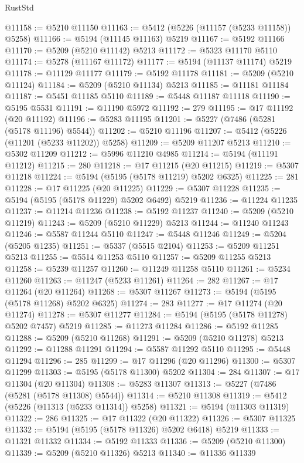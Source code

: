 \begin{lexlean}{RustStd}
\begin{coremodule}
@11158 := @5210 @11150
@11163 := @5412 (@5226 (@11157 (@5233 @11158)) @5258)
@11166 := @5194 (@11145 @11163) @5219
@11167 := @5192 @11166
@11170 := @5209 (@5210 @11142) @5213
@11172 := @5323 @11170 @5110
@11174 := @5278 (@11167 @11172)
@11177 := @5194 (@11137 @11174) @5219
@11178 := @11129 @11177
@11179 := @5192 @11178
@11181 := @5209 (@5210 @11124)
@11184 := @5209 (@5210 @11134) @5213
@11185 := @11181 @11184
@11187 := @5451 @11185 @5110
@11189 := @5448 @11187 @11118
@11190 := @5195 @5531
@11191 := @11190 @5972
@11192 := 279
@11195 := @17 @11192 (@20 @11192)
@11196 := @5283 @11195
@11201 := @5227 (@7486 (@5281 (@5178 @11196) @5544))
@11202 := @5210 @11196
@11207 := @5412 (@5226 (@11201 (@5233 @11202)) @5258)
@11209 := @5209 @11207 @5213
@11210 := @5302 @11209
@11212 := @5996 @11210 @4985
@11214 := @5194 (@11191 @11212)
@11215 := 280
@11218 := @17 @11215 (@20 @11215)
@11219 := @5307 @11218
@11224 := @5194 (@5195 (@5178 @11219) @5202 @6325)
@11225 := 281
@11228 := @17 @11225 (@20 @11225)
@11229 := @5307 @11228
@11235 := @5194 (@5195 (@5178 @11229) @5202 @6492) @5219
@11236 := @11224 @11235
@11237 := @11214 @11236
@11238 := @5192 @11237
@11240 := @5209 (@5210 @11219)
@11243 := @5209 (@5210 @11229) @5213
@11244 := @11240 @11243
@11246 := @5587 @11244 @5110
@11247 := @5448 @11246
@11249 := @5204 (@5205 @1235)
@11251 := @5337 (@5515 @2104)
@11253 := @5209 @11251 @5213
@11255 := @5514 @11253 @5110
@11257 := @5209 @11255 @5213
@11258 := @5239 @11257
@11260 := @11249 @11258 @5110
@11261 := @5234 @11260
@11263 := @11247 (@5233 @11261)
@11264 := 282
@11267 := @17 @11264 (@20 @11264)
@11268 := @5307 @11267
@11273 := @5194 (@5195 (@5178 @11268) @5202 @6325)
@11274 := 283
@11277 := @17 @11274 (@20 @11274)
@11278 := @5307 @11277
@11284 := @5194 (@5195 (@5178 @11278) @5202 @7457) @5219
@11285 := @11273 @11284
@11286 := @5192 @11285
@11288 := @5209 (@5210 @11268)
@11291 := @5209 (@5210 @11278) @5213
@11292 := @11288 @11291
@11294 := @5587 @11292 @5110
@11295 := @5448 @11294
@11296 := 285
@11299 := @17 @11296 (@20 @11296)
@11300 := @5307 @11299
@11303 := @5195 (@5178 @11300) @5202
@11304 := 284
@11307 := @17 @11304 (@20 @11304)
@11308 := @5283 @11307
@11313 := @5227 (@7486 (@5281 (@5178 @11308) @5544))
@11314 := @5210 @11308
@11319 := @5412 (@5226 (@11313 (@5233 @11314)) @5258)
@11321 := @5194 (@11303 @11319)
@11322 := 286
@11325 := @17 @11322 (@20 @11322)
@11326 := @5307 @11325
@11332 := @5194 (@5195 (@5178 @11326) @5202 @6418) @5219
@11333 := @11321 @11332
@11334 := @5192 @11333
@11336 := @5209 (@5210 @11300)
@11339 := @5209 (@5210 @11326) @5213
@11340 := @11336 @11339

\end{coremodule}
\end{lexlean}
